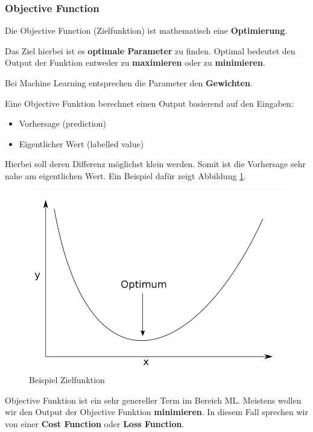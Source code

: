 \newpage
\subsubsection{Objective Function}

Die Objective Function (Zielfunktion) ist mathematisch eine \textbf{Optimierung}.

Das Ziel hierbei ist es \textbf{optimale Parameter} zu finden. Optimal bedeutet den Output der Funktion entweder zu \textbf{maximieren} oder zu \textbf{minimieren}. 


Bei Machine Learning entsprechen die Parameter den \textbf{Gewichten}.


Eine Objective Funktion berechnet einen Output basierend auf den Eingaben:

\begin{itemize}
  \item Vorhersage (prediction)
  \item Eigentlicher Wert (labelled value)
\end{itemize}

Hierbei soll deren Differenz möglichst klein werden. Somit ist die Vorhersage sehr nahe am eigentlichen Wert. Ein Beispiel dafür zeigt Abbildung \ref{fig:objective_minimum}. 


\begin{figure}[h!]
	\includegraphics[scale=0.4]{figures/objective_minimum}
	\caption{Beispiel Zielfunktion}
	\label{fig:objective_minimum}
\end{figure}



Objective Funktion ist ein sehr genereller Term im Bereich ML.
Meistens wollen wir den Output der Objective Funktion \textbf{minimieren}. In diesem Fall sprechen wir von einer \textbf{Cost Function} oder \textbf{Loss Function}.


